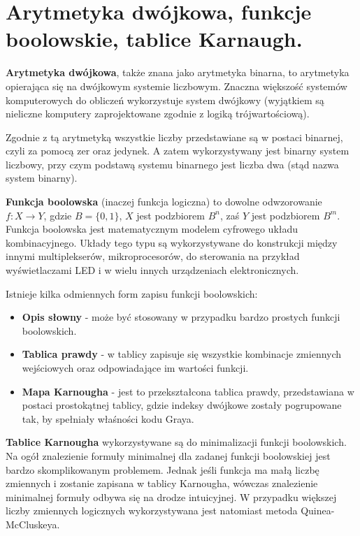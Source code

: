 \documentclass[../main.tex]{subfiles}
\begin{document}
\section{Arytmetyka dwójkowa, funkcje boolowskie, tablice Karnaugh.}

\textbf{Arytmetyka dwójkowa}, także znana jako arytmetyka binarna, to arytmetyka opierająca się na dwójkowym systemie liczbowym. Znaczna większość systemów komputerowych do obliczeń wykorzystuje system dwójkowy (wyjątkiem są nieliczne komputery zaprojektowane zgodnie z logiką trójwartościową).

Zgodnie z tą arytmetyką wszystkie liczby przedstawiane są w postaci binarnej, czyli za pomocą zer oraz jedynek. A zatem wykorzystywany jest binarny system liczbowy, przy czym podstawą systemu binarnego jest liczba dwa (stąd nazwa system binarny).


\textbf{Funkcja boolowska} (inaczej funkcja logiczna) to dowolne odwzorowanie $f: X \rightarrow Y$, gdzie $B = \{0, 1\}$, $X$ jest podzbiorem $B^{n}$, zaś $Y$ jest podzbiorem $B^{m}$. Funkcja boolowska jest matematycznym modelem cyfrowego układu kombinacyjnego. Układy tego typu są wykorzystywane do konstrukcji między innymi multiplekserów, mikroprocesorów, do sterowania na przykład wyświetlaczami LED i w wielu innych urządzeniach elektronicznych.

Istnieje kilka odmiennych form zapisu funkcji boolowskich:
\begin{itemize}
    \item \textbf{Opis słowny} - może być stosowany w przypadku bardzo prostych funkcji boolowskich.
    \item \textbf{Tablica prawdy} - w tablicy zapisuje się wszystkie kombinacje zmiennych wejściowych oraz odpowiadające im wartości funkcji.
    \item \textbf{Mapa Karnougha} - jest to przekształcona tablica prawdy, przedstawiana w postaci prostokątnej tablicy, gdzie indeksy dwójkowe zostały pogrupowane tak, by spełniały właśności kodu Graya.
\end{itemize}

\textbf{Tablice Karnougha} wykorzystywane są do minimalizacji funkcji boolowskich. Na ogół znalezienie formuły minimalnej dla zadanej funkcji boolowskiej jest bardzo skomplikowanym problemem. Jednak jeśli funkcja ma małą liczbę zmiennych i zostanie zapisana w tablicy Karnougha, wówczas znalezienie minimalnej formuły odbywa się na drodze intuicyjnej. W przypadku większej liczby zmiennych logicznych wykorzystywana jest natomiast metoda Quinea-McCluskeya.
\end{document}
